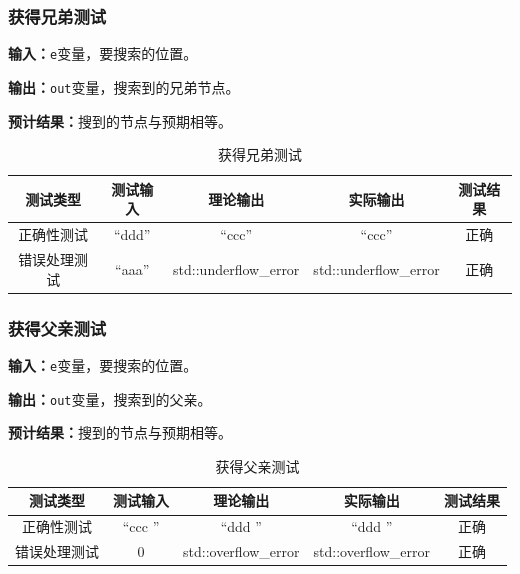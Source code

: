 \subsubsection{获得兄弟测试}
\textbf{输入：}\texttt{e}变量，要搜索的位置。
\par
\textbf{输出：}\texttt{out}变量，搜索到的兄弟节点。
\par
\textbf{预计结果：}搜到的节点与预期相等。
\begin{table}[Htb]
    \centering
    \caption{获得兄弟测试}
    \begin{tabular}{@{}ccccc@{}}
        \toprule
        \multicolumn{1}{c}{测试类型}    & \multicolumn{1}{c}{测试输入} & \multicolumn{1}{c}{理论输出} & \multicolumn{1}{c}{实际输出} &
        \multicolumn{1}{c}{测试结果} \\ \midrule
        \multicolumn{1}{c|}{正确性测试}  & ``ddd''&``ccc''&``ccc''&正确\\
        \multicolumn{1}{c|}{错误处理测试} & ``aaa''& std::underflow\_error& std::underflow\_error& 正确\\ \bottomrule
    \end{tabular}
    \label{tab:priortest3}
\end{table}

\subsubsection{获得父亲测试}
\textbf{输入：}\texttt{e}变量，要搜索的位置。
\par
\textbf{输出：}\texttt{out}变量，搜索到的父亲。
\par
\textbf{预计结果：}搜到的节点与预期相等。
\begin{table}[Htb]
    \centering
    \caption{获得父亲测试}
    \begin{tabular}{@{}ccccc@{}}
        \toprule
        \multicolumn{1}{c}{测试类型}    & \multicolumn{1}{c}{测试输入} & \multicolumn{1}{c}{理论输出} & \multicolumn{1}{c}{实际输出} &
        \multicolumn{1}{c}{测试结果} \\ \midrule
        \multicolumn{1}{c|}{正确性测试}  & ``ccc ''&``ddd ''&``ddd ''&正确\\
        \multicolumn{1}{c|}{错误处理测试} & 0& std::overflow\_error& std::overflow\_error& 正确\\ \bottomrule
    \end{tabular}
    \label{tab:nexttest3}
\end{table}

